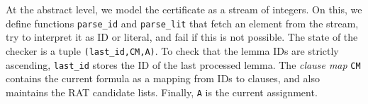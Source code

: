 \documentclass{llncs}
\newcommand{\isai}{\lstinline[language=isabelle,basicstyle=\normalsize\ttfamily\slshape]}
\begin{document}
At the abstract level, we model the certificate as a stream of integers. On this, we define functions \isai$parse_id$ and \isai$parse_lit$ that fetch an 
element from the stream, try to interpret it as ID or literal, and fail if this is not possible.
The state of the checker is a tuple \isai$(last_id,CM,A)$. To check that the lemma IDs are strictly ascending, \isai{last_id} stores the ID of the last processed lemma.
The \emph{clause map} \isai{CM} contains the current formula as a mapping from IDs to clauses, and also maintains the RAT candidate lists. Finally, \isai$A$ is the current assignment.


% 
% 
\end{document}
